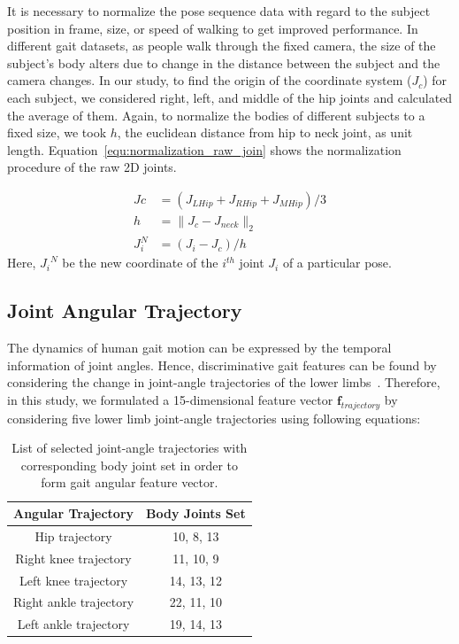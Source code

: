 It is necessary to normalize the pose sequence data with regard to the subject position in frame, size, or speed of walking to get improved performance. In different gait datasets, as people walk through the fixed camera, the size of the subject's body alters due to change in the distance between the subject and the camera changes. In our study, to find the origin of the coordinate system ($J_c$) for each subject, we considered right, left, and middle of the hip joints and calculated the average of them. Again, to normalize the bodies of different subjects to a fixed size, we took $ h $, the euclidean distance from hip to neck joint, as unit length. Equation~\ref{equ:normalization_raw_join} shows the normalization procedure of the raw 2D joints.

\begin{equation} \label{equ:normalization_raw_joint}
\begin{split}
	Jc &= {(J_{LHip} +J_{RHip} +J_{MHip})} / {3} \\
	h &= \parallel {J_c} - {J_{neck}}\parallel_2  \\
	J_{i}^{N}  &= (J_i - J_c) / h 
\end{split}
\end{equation}
Here, ${J_i}^N$ be the new coordinate of the $i^{th}$ joint $J_{i}$ of a particular pose.


\subsection{Joint Angular Trajectory}
The dynamics of human gait motion can be expressed by the temporal information of joint angles. Hence, discriminative gait features can be found by considering the change in joint-angle trajectories of the lower limbs~\cite{Wang_04}. Therefore, in this study, we formulated a 15-dimensional feature vector $\boldsymbol{f}_{trajectory}$ by considering five lower limb joint-angle trajectories using following equations: 

\begin{table}
	\centering
	\caption{List of selected joint-angle trajectories with corresponding body joint set in order to form gait angular feature vector. \label{table:list_joint_angle_trajectory}}
	\begin{tabular}{cc}
		\hline
		\textbf{Angular Trajectory} & \textbf{Body Joints Set}\\
		
		\hline
		Hip trajectory &10, 8, 13 \\
		Right knee trajectory  &11, 10, 9 \\
		Left knee trajectory &14, 13, 12 \\
		Right ankle trajectory &22, 11, 10 \\
		Left ankle trajectory &19, 14, 13 \\
		\hline
	\end{tabular}
\end{table}


